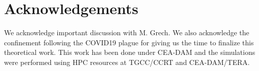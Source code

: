\documentclass[
 reprint,
 amsmath,amssymb,
 aps,
]{revtex4-1}
\begin{document}






\section*{Acknowledgements}
We acknowledge important discussion with M. Grech.  We also acknowledge the confinement following the COVID19 plague for giving us the time to finalize this theoretical work. 
This work has been done under CEA-DAM and
the simulations were performed using HPC resources at TGCC/CCRT and CEA-DAM/TERA.

\end{document}
